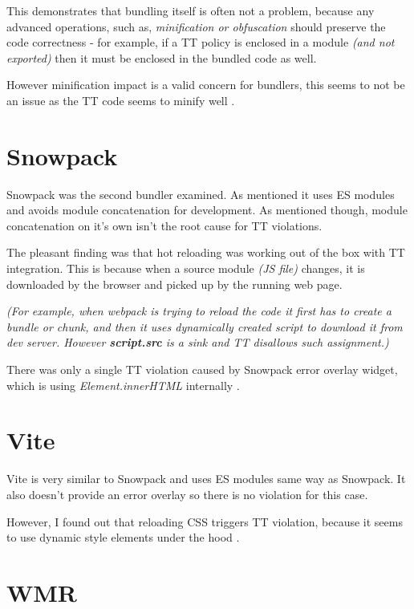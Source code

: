 This demonstrates that bundling itself is often not a problem, because any advanced operations, such
as, \emph{minification or obfuscation} should preserve the code correctness - for example, if a TT
policy is enclosed in a module \emph{(and not exported)} then it must be enclosed in the bundled
code as well.

However minification impact is a valid concern for bundlers, this seems to not be an issue as the TT
code seems to minify well \cite{tt_webpack_integration_minification}.

\section{Snowpack}

Snowpack was the second bundler examined. As mentioned it uses ES modules and avoids module
concatenation for development. As mentioned though, module concatenation on it's own isn't the root
cause for TT violations.

The pleasant finding was that hot reloading was working out of the box with TT integration. This is
because when a source module \emph{(JS file)} changes, it is downloaded by the browser and picked up
by the running web page.

\emph{(For example, when webpack is trying to reload the code it first has to create a bundle or
  chunk, and then it uses dynamically created script to download it from dev server. However
  \textbf{script.src} is a sink and TT disallows such assignment.)}

There was only a single TT violation caused by Snowpack error overlay widget, which is using
\emph{Element.innerHTML} internally \cite{snowpack_violation}.

\section{Vite}

Vite is very similar to Snowpack and uses ES modules same way as Snowpack. It also doesn't provide
an error overlay so there is no violation for this case.

However, I found out that reloading CSS triggers TT violation, because it seems to use dynamic style
elements under the hood \cite{vite_violation}.

\section{WMR}

